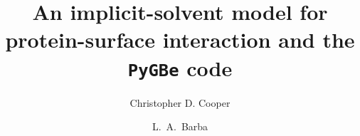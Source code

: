 \documentclass[final,5p,times,twocolumn]{elsarticle}
\newcommand{\pygbe}{\texttt{PyGBe}\xspace}
\begin{document}
\begin{frontmatter}



\title{An implicit-solvent model for protein-surface interaction and the \pygbe code} %

\author[bu,usm]{Christopher D. Cooper}

\author[gwu]{L.~A.~Barba}

\address[bu]{Department of Mechanical Engineering, Boston University, Boston, MA.}
\address[gwu]{Department of Mechanical \& Aerospace Engineering, The George Washington University, Washington, D.C.}
\address[usm]{Department of Mechanical Engineering, Universidad T\'ecnica Federico Santa Mar\'ia, Valpara\'iso, Chile.}


\begin{abstract}


\end{abstract}
\end{frontmatter}
\end{document}
